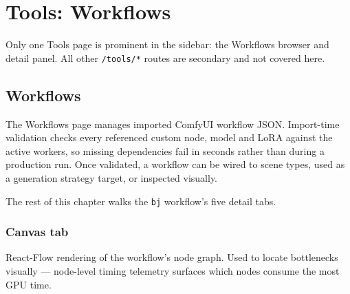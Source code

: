\chapter{Tools: Workflows}
\label{ch:tools}

Only one Tools page is prominent in the sidebar: the Workflows browser and
detail panel. All other \texttt{/tools/*} routes are secondary and not
covered here.

\section{Workflows}
\label{sec:tools-workflows}

The Workflows page manages imported ComfyUI workflow JSON. Import-time validation
checks every referenced custom node, model and LoRA against the active workers,
so missing dependencies fail in seconds rather than during a production run.
Once validated, a workflow can be wired to scene types, used as a generation
strategy target, or inspected visually.


\begin{itemize}
\end{itemize}


The rest of this chapter walks the \texttt{bj} workflow's five detail tabs.

\subsection{Canvas tab}
React-Flow rendering of the workflow's node graph. Used to locate bottlenecks
visually — node-level timing telemetry surfaces which nodes consume the most
GPU time.

